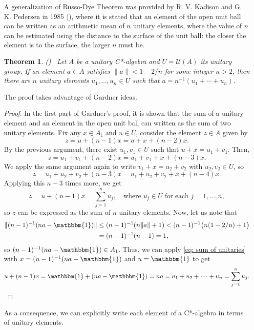 \documentclass[12pt,english]{article}
\newtheorem{theorem}{Theorem}[section]
\theoremstyle{definition}
\theoremstyle{remark}
\begin{document}
A generalization of Russo-Dye Theorem was provided by R. V. Kadison and G. K. Pedersen in 1985 (\cite{kadison-pedersen 85}), where it is stated that an element of the open unit ball can be written as an arithmetic mean of $n$ unitary elements, where the value of $n$ can be estimated using the distance to the surface of the unit ball: the closer the element is to the surface, the larger $n$ must be. 

\begin{theorem} \label{thm:kadisonPedersen1} {\normalfont (\cite[Theorem 1]{kadison-pedersen 85})} \ 
	Let $A$ be a unitary C*-algebra and $U=\mathcal{U}(A)$ its unitary group. If an element $a\in A$ satisfies $\|a\|<1-2/n$ for some integer $n>2$, then there are $n$ unitary elements $u_1,\ldots,u_n\in U$ such that $a=n^{-1}(u_1+\cdots+u_n)$.
\end{theorem}

The proof takes advantage of Gardner ideas.

\begin{proof}
	In the first part of Gardner's proof, it is shown that the sum of a unitary element and an element in the open unit ball can written as the sum of two unitary elements. Fix any $x\in A_1$ and $u\in U$, consider the element $z\in A$ given by
	\[z=u+(n-1)x=u+x+(n-2)x.\]
	By the previous argument, there exist $u_1,v_1\in U$ such that $u+x=u_1+v_1$. Then,
	\[z=u_1+v_1+(n-2)x=u_1+v_1+x+(n-3)x.\]
	We apply the same argument again to write $v_1+x=u_2+v_2$ with $u_2,v_2\in U$, so
	\[z=u_1+u_2+v_2+(n-3)x=u_1+u_2+v_2+x+(n-4)x.\]
	Applying this $n-3$ times more, we get
	\begin{equation}\label{eq: sum of unitaries}
	z=u+(n-1)x=\sum_{j=1}^n u_j,\quad\text{where $u_j\in U$ for each $j=1,\ldots,n$},
	\end{equation}
	so $z$ can be expressed as the sum of $n$ unitary elements.
	Now, let us note that
	\begin{align*}
	\|(n-1)^{-1}(na-\mathbbm{1})\|&\leq (n-1)^{-1}(n\|a\|+1)<(n-1)^{-1}\big(n(1-2/n)+1\big) \\
	&=(n-1)^{-1}(n-1)=1,
	\end{align*}
	so $(n-1)^{-1}(na-\mathbbm{1})\in A_1$. Thus, we can apply \eqref{eq: sum of unitaries} with $x=(n-1)^{-1}(na-\mathbbm{1})$ and $u=\mathbbm{1}$ to get
	\[u+(n-1)x=\mathbbm{1}+(na-\mathbbm{1})=na=u_1+u_2+\cdots+u_n=\sum_{j=1}^n u_j.\]
\end{proof}

As a consequence, we can explicitly write each element of a C*-algebra in terms of unitary elements.
\end{document}
